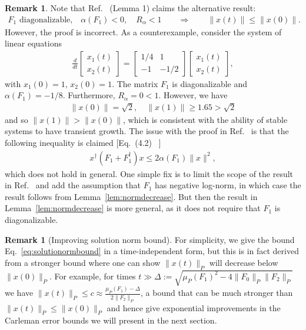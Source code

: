 \documentclass[superscriptaddress,onecolumn,nofootinbib,longbibliography,a4paper,accepted=2026-09-29]{quantumarticle}
\theoremstyle{plain}
\theoremstyle{definition}
\newtheorem{rmk}[thm]{Remark}
\numberwithin{thm}{section}
\numberwithin{assumption}{section}
\numberwithin{lemma}{section}
\numberwithin{prop}{section}
\numberwithin{cor}{section}
\numberwithin{definition}{section}
\numberwithin{rmk}{section}
\numberwithin{equation}{section}
\begin{document}
\begin{rmk}
\label{issue1liu}
    Note that Ref.~\cite{liu2021efficient} (Lemma 1) claims the alternative result:
    \begin{align*}
        F_1  \textrm{ diagonalizable,}\quad
    \alpha(F_1)<0,\quad R_{\alpha} <1 \qquad\Rightarrow\qquad \|x(t)\| \le \|x(0)\|.
    \end{align*}
    However, the proof is incorrect. As a counterexample, consider the system of linear equations
    \begin{align}
      \frac{d}{dt}  \begin{bmatrix}
            x_1(t) \\ x_2(t) 
        \end{bmatrix} = 
        \begin{bmatrix}
            1/4 & 1 \\
            -1 & -1/2
        \end{bmatrix}  \begin{bmatrix}
            x_1(t) \\ x_2(t) 
        \end{bmatrix},
    \end{align}
    with $x_1(0) = 1$, $x_2(0) = 1$. The matrix $F_1$ is diagonalizable and $\alpha(F_1)=-1/8$. Furthermore, $R_{\alpha} = 0 <1$. However, we have
    \begin{align}
        \|x(0)\| = \sqrt{2}, \quad \|x(1)\| \geq 1.65 > \sqrt{2}
    \end{align}
    and so $\|x(1)\|> \|x(0)\|$, which is consistent with the ability of stable systems to have transient growth. 
    The issue with the proof in Ref.~\cite{liu2021efficient} is that the following inequality is claimed [Eq.~(4.2) ~\cite{liu2021efficient}]
    \begin{align}
    \label{eq:error}
        x^\dag (F_1 + F^\dag_1) x \leq 2 \alpha(F_1) \| x\|^2,
    \end{align} 
    which does not hold in general. One simple fix is to limit the scope of the result in Ref.~\cite{liu2021efficient} and add the assumption that $F_1$ has negative log-norm, in which case the result follows from Lemma~\ref{lem:normdecrease}. But then the result in Lemma~\ref{lem:normdecrease} is more general, as it does not require that $F_1$ is diagonalizable.
\end{rmk}

\begin{rmk}[Improving solution norm bound]
For simplicity, we give the bound Eq.~\eqref{eq:solutionormbound} in a time-independent form, but this is in fact derived from a stronger bound where one can show $\|x(t)\|_P$ will decrease below $\|x(0)\|_P$. For example, for times $t \gg \Delta :=  \sqrt{\mu_P(F_1)^2 - 4 \| F_0\|_P \| F_2\|_P}$ we have $\| x(t)\|_P \leq c \approx \frac{\mu_P(F_1) - \Delta}{2 \|F_2\|_P}$, a bound that can be much stronger than $\|x(t)\|_P \leq \|x(0)\|_P$ and hence give exponential improvements in the Carleman error bounds we will present in the next section.
\end{rmk}
\end{document}
